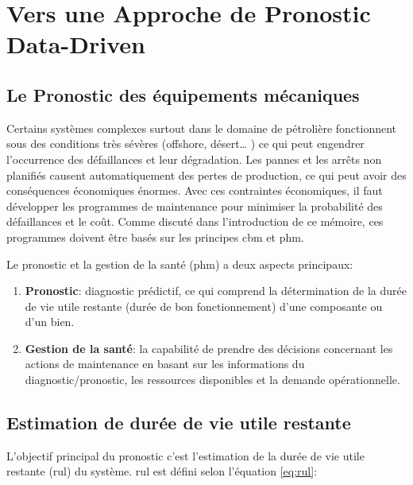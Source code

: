 \chapter{Vers une Approche de Pronostic Data-Driven}


\section{Le Pronostic des équipements mécaniques}
Certains systèmes complexes surtout dans le domaine de pétrolière fonctionnent sous des conditions très sévères (offshore, désert… ) ce qui peut engendrer l’occurrence des défaillances et leur dégradation. Les pannes et les arrêts non planifiés causent automatiquement des pertes de production, ce qui peut avoir des conséquences économiques énormes. Avec ces contraintes économiques, il faut développer les programmes de maintenance pour minimiser la probabilité des défaillances et le coût. Comme discuté dans l'introduction de ce mémoire, ces programmes doivent être basés sur les principes \acrlong{cbm} et \acrlong{phm}.

Le pronostic et la gestion de la santé (\acrlong{phm}) a deux aspects principaux\cite{Hess2008}:

\begin{enumerate}
    \item \textbf{Pronostic}: diagnostic prédictif, ce qui comprend la détermination de la durée de vie utile restante (durée de bon fonctionnement) d'une composante ou d'un bien.
    \item \textbf{Gestion de la santé}: la capabilité de prendre des décisions concernant les actions de maintenance en basant sur les informations du diagnostic/pronostic, les ressources disponibles et la demande opérationnelle.
\end{enumerate}

\section{Estimation de durée de vie utile restante}
\label{section:rul}
\label{section:rul-estimation}
L'objectif principal du pronostic c'est l'estimation de la durée de vie utile restante (\acrlong{rul}) du système.
\acrshort{rul} est défini selon l'équation \ref{eq:rul}:

